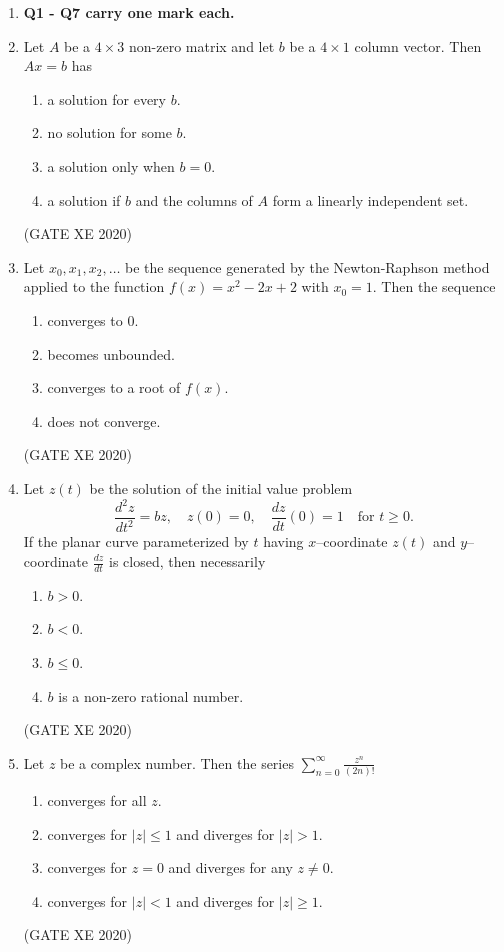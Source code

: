 \documentclass[12pt]{article}
\begin{document}
\begin{enumerate}

\item[] \textbf{Q1 - Q7 carry one mark each.} 

\item Let $A$ be a $4 \times 3$ non-zero matrix and let $b$ be a $4 \times 1$ column vector. Then $Ax = b$ has  
\begin{enumerate}
\item a solution for every $b$.  
\item no solution for some $b$.  
\item a solution only when $b = 0$.  
\item a solution if $b$ and the columns of $A$ form a linearly independent set.  
\end{enumerate}
(GATE XE 2020)

\item Let $x_0, x_1, x_2, \ldots$ be the sequence generated by the Newton-Raphson method applied to the function $f(x) = x^2 - 2x + 2$ with $x_0 = 1$. Then the sequence  
\begin{enumerate}
\item converges to $0$.  
\item becomes unbounded.  
\item converges to a root of $f(x)$.  
\item does not converge.  
\end{enumerate}
(GATE XE 2020)

\item Let $z(t)$ be the solution of the initial value problem  
$$
\frac{d^2 z}{dt^2} = bz,\quad z(0) = 0,\quad \frac{dz}{dt}(0) = 1 \quad \text{for } t \geq 0.
$$
If the planar curve parameterized by $t$ having $x$--coordinate $z(t)$ and $y$--coordinate $\frac{dz}{dt}$ is closed, then necessarily  
\begin{enumerate}
\item $b > 0$.  
\item $b < 0$.  
\item $b \leq 0$.  
\item $b$ is a non-zero rational number.  
\end{enumerate}
(GATE XE 2020)

\item Let $z$ be a complex number. Then the series $\sum_{n=0}^{\infty} \frac{z^n}{(2n)!}$ 
  \begin{enumerate}
    \item converges for all $z$.
    \item converges for $|z|\leq 1$ and diverges for $|z|>1$.
    \item converges for $z=0$ and diverges for any $z \neq 0$.
    \item converges for $|z|<1$ and diverges for $|z|\geq 1$.
  \end{enumerate}
(GATE XE 2020)


\end{enumerate}
\end{document}

